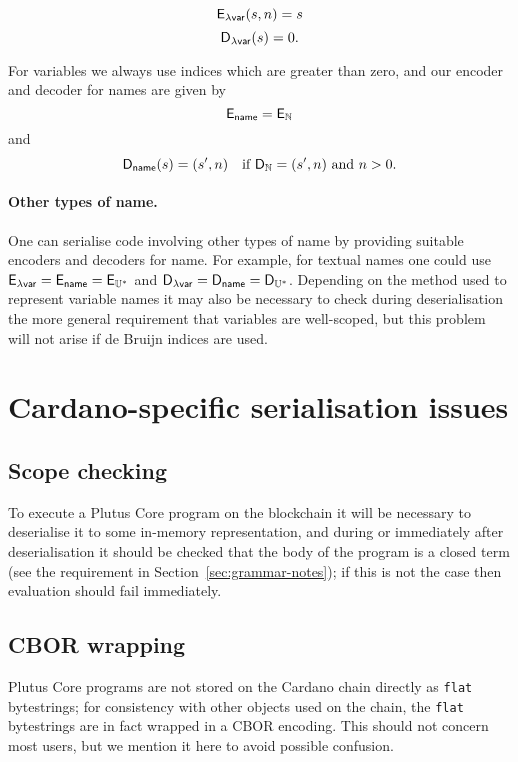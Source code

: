 $$
\mathsf{E}_{\mathsf{\text{$\lambda$}var}}(s, n) = s
$$
$$
\mathsf{D}_{\mathsf{\text{$\lambda$}var}}(s) = 0.
$$

\noindent For variables we always use indices which are greater than zero, and our
encoder and decoder for names are given by
$$
\mathsf{E}_{\mathsf{name}} = \mathsf{E}_{\mathbb{N}}
$$
and
$$
\mathsf{D}_{\mathsf{name}} (s) = (s', n) \quad \text{if $\mathsf{D}_{\mathbb{N}} = (s', n)$ and $n>0$}.
$$


\paragraph{Other types of name.}
One can serialise code involving other types of name by providing suitable
encoders and decoders for name.  For example, for textual names one could use
$\mathsf{E}_{\mathsf{\text{$\lambda$}var}} = \mathsf{E}_{\mathsf{name}} = \mathsf{E}_{\mathbb{U}^*}$ and $\mathsf{D}_{\mathsf{\text{$\lambda$}var}} = \mathsf{D}_{\mathsf{name}} = \mathsf{D}_{\mathbb{U}^*}$.  Depending
on the method used to represent variable names it may also be necessary to check
during deserialisation the more general requirement that variables are
well-scoped, but this problem will not arise if de Bruijn indices are used.

\section{Cardano-specific serialisation issues}
\label{sec:cardano-issues}
\subsection{Scope checking}
To execute a Plutus Core program on the blockchain it will be necessary to
deserialise it to some in-memory representation, and during or immediately after
deserialisation it should be checked that the body of the program is a closed
term (see the requirement in Section~\ref{sec:grammar-notes}); if this is not
the case then evaluation should fail immediately.

\subsection{CBOR wrapping}
Plutus Core programs are not stored on the Cardano chain directly as
\texttt{flat} bytestrings; for consistency with other objects used on the chain,
the \texttt{flat} bytestrings are in fact wrapped in a CBOR encoding.  This
should not concern most users, but we mention it here to avoid possible
confusion.



